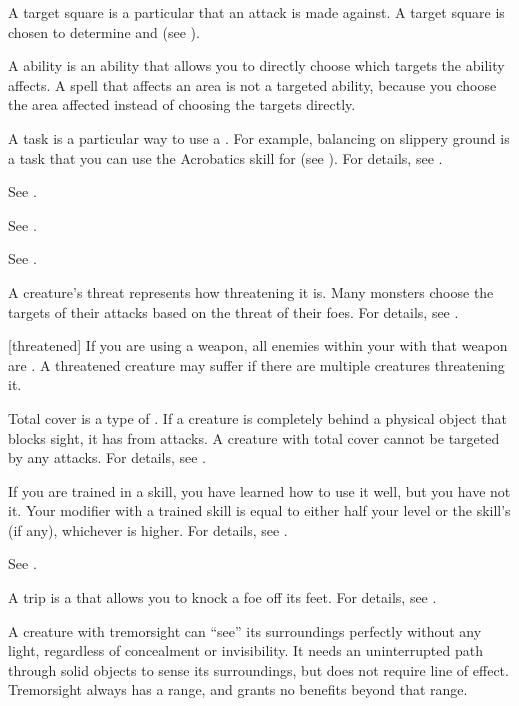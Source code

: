  A target square is a particular  that an attack is made against.
A target square is chosen to determine  and  (see ).

 A  ability is an ability that allows you to directly choose which targets the ability affects.
A spell that affects an area is not a targeted ability, because you choose the area affected instead of choosing the targets directly.

 A task is a particular way to use a .
For example, balancing on slippery ground is a task that you can use the Acrobatics skill for (see ).
For details, see .

 See .

 See .

 See .

 A creature's threat represents how threatening it is.
Many monsters choose the targets of their attacks based on the threat of their foes.
For details, see .

[threatened] If you are using a  weapon, all enemies within your  with that weapon are .
A threatened creature may suffer  if there are multiple creatures threatening it.

 Total cover is a type of .
If a creature is completely behind a physical object that blocks sight, it has  from attacks.
A creature with total cover cannot be targeted by any attacks.
For details, see .

 If you are trained in a skill, you have learned how to use it well, but you have not  it.
Your modifier with a trained skill is equal to either half your level  or the skill's  (if any), whichever is higher.
For details, see .

 See .

 A trip is a  that allows you to knock a foe off its feet.
For details, see .

 A creature with tremorsight can ``see'' its surroundings perfectly without any light, regardless of concealment or invisibility.
It needs an uninterrupted path through solid objects to sense its surroundings, but does not require line of effect.
Tremorsight always has a range, and grants no benefits beyond that range.

